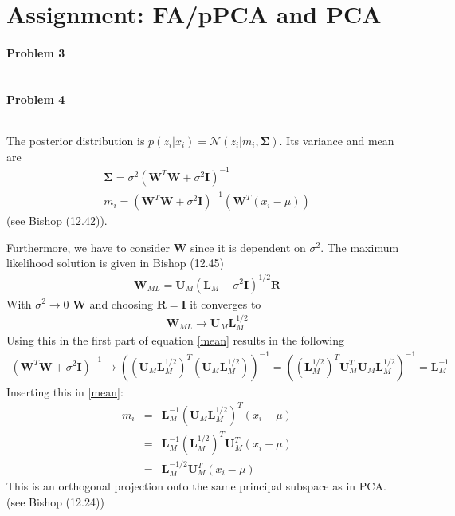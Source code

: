 \documentclass{article}
\newcommand{\Mtx}[1]{\ensuremath{\mathbf{#1}}}
\begin{document}
\section{Assignment: FA/pPCA and PCA}
\paragraph*{Problem 3}
$\;$



\paragraph*{Problem 4}
$\;$ 

The posterior distribution is $p(z_i|x_i) = \mathcal{N}(z_i|m_i, \Mtx{\Sigma})$. Its variance and mean are
\begin{eqnarray}
\Mtx{\Sigma} = \sigma^2 (\Mtx{W}^T\Mtx{W}+\sigma^2\Mtx{I})^{-1}\\
m_i = (\Mtx{W}^T\Mtx{W} + \sigma^2\Mtx{I})^{-1} (\Mtx{W}^T (x_i-\mu))
\label{mean}
\end{eqnarray}
(see Bishop (12.42)).

Furthermore, we have to consider $\Mtx{W}$ since it is dependent on $\sigma^2$.
The maximum likelihood solution is given in Bishop (12.45)
\begin{eqnarray}
\Mtx{W}_{ML} = \Mtx{U}_M(\Mtx{L}_M-\sigma^2\Mtx{I})^{1/2}\Mtx{R}
\end{eqnarray}
With $\sigma^2 \rightarrow 0$ $\Mtx{W}$ and choosing $\Mtx{R}=\Mtx{I}$ it converges to
\begin{eqnarray}
\Mtx{W}_{ML} \rightarrow \Mtx{U}_M \Mtx{L}_M^{1/2}
\end{eqnarray}
Using this in the first part of equation \ref{mean} results in the following
\begin{eqnarray}
(\Mtx{W}^T\Mtx{W} + \sigma^2\Mtx{I})^{-1} \rightarrow ((\Mtx{U}_M \Mtx{L}_M^{1/2})^T(\Mtx{U}_M \Mtx{L}_M^{1/2}))^{-1} = ((\Mtx{L}_M^{1/2})^T \Mtx{U}_M^T \Mtx{U}_M \Mtx{L}_M^{1/2})^{-1} = \Mtx{L}_M^{-1}
\end{eqnarray}
Inserting this in \ref{mean}:
\begin{eqnarray}
m_i &=& \Mtx{L}_M^{-1} (\Mtx{U}_M \Mtx{L}_M^{1/2})^T (x_i - \mu)\\
&=& \Mtx{L}_M^{-1} (\Mtx{L}_M^{1/2})^T \Mtx{U}_M^T (x_i - \mu)\\
&=& \Mtx{L}_M^{-1/2} \Mtx{U}_M^T (x_i - \mu)
\end{eqnarray}
This is an orthogonal projection onto the same principal subspace as in PCA. (see Bishop (12.24))
\end{document}
